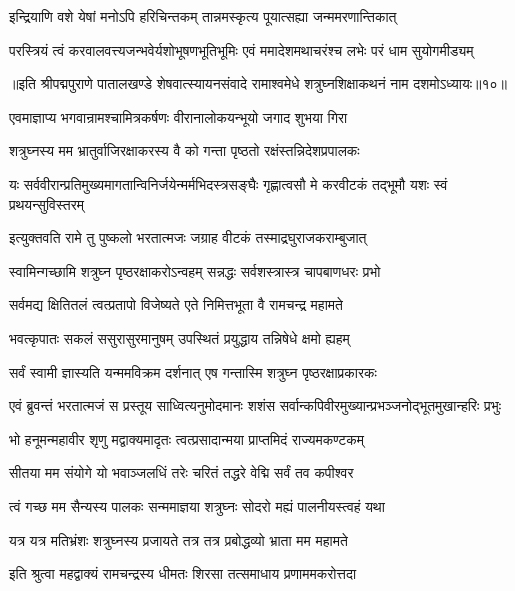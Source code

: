\twolineshloka
{इन्द्रियाणि वशे येषां मनोऽपि हरिचिन्तकम्}
{तान्नमस्कृत्य पूयात्सह्या जन्ममरणान्तिकात्}%

\twolineshloka
{परस्त्रियं त्वं करवालवत्त्यजन्भवेर्यशोभूषणभूतिभूमिः}
{एवं ममादेशमथाचरंश्च लभेः परं धाम सुयोगमीड्यम्}%

{॥इति श्रीपद्मपुराणे पातालखण्डे शेषवात्स्यायनसंवादे रामाश्वमेधे शत्रुघ्नशिक्षाकथनं नाम दशमोऽध्यायः॥१०॥}



\twolineshloka
{एवमाज्ञाप्य भगवान्रामश्चामित्रकर्षणः}
{वीरानालोकयन्भूयो जगाद शुभया गिरा}%

\twolineshloka
{शत्रुघ्नस्य मम भ्रातुर्वाजिरक्षाकरस्य वै}
{को गन्ता पृष्ठतो रक्षंस्तन्निदेशप्रपालकः}%

\twolineshloka
{यः सर्ववीरान्प्रतिमुख्यमागतान्विनिर्जयेन्मर्मभिदस्त्रसङ्घैः}
{गृह्णात्वसौ मे करवीटकं तद्भूमौ यशः स्वं प्रथयन्सुविस्तरम्}%

\twolineshloka
{इत्युक्तवति रामे तु पुष्कलो भरतात्मजः}
{जग्राह वीटकं तस्माद्रघुराजकराम्बुजात्}%

\twolineshloka
{स्वामिन्गच्छामि शत्रुघ्न पृष्ठरक्षाकरोऽन्वहम्}
{सन्नद्धः सर्वशस्त्रास्त्र चापबाणधरः प्रभो}%

\twolineshloka
{सर्वमद्य क्षितितलं त्वत्प्रतापो विजेष्यते}
{एते निमित्तभूता वै रामचन्द्र महामते}%

\twolineshloka
{भवत्कृपातः सकलं ससुरासुरमानुषम्}
{उपस्थितं प्रयुद्धाय तन्निषेधे क्षमो ह्यहम्}%

\twolineshloka
{सर्वं स्वामी ज्ञास्यति यन्ममविक्रम दर्शनात्}
{एष गन्तास्मि शत्रुघ्न पृष्ठरक्षाप्रकारकः}%

\twolineshloka
{एवं ब्रुवन्तं भरतात्मजं स प्रस्तूय साध्वित्यनुमोदमानः}
{शशंस सर्वान्कपिवीरमुख्यान्प्रभञ्जनोद्भूतमुखान्हरिः प्रभुः}%

\twolineshloka
{भो हनूमन्महावीर शृणु मद्वाक्यमादृतः}
{त्वत्प्रसादान्मया प्राप्तमिदं राज्यमकण्टकम्}%

\twolineshloka
{सीतया मम संयोगे यो भवाञ्जलधिं तरेः}
{चरितं तद्धरे वेद्मि सर्वं तव कपीश्वर}%

\twolineshloka
{त्वं गच्छ मम सैन्यस्य पालकः सन्ममाज्ञया}
{शत्रुघ्नः सोदरो मह्यं पालनीयस्त्वहं यथा}%

\twolineshloka
{यत्र यत्र मतिभ्रंशः शत्रुघ्नस्य प्रजायते}
{तत्र तत्र प्रबोद्धव्यो भ्राता मम महामते}%

\twolineshloka
{इति श्रुत्वा महद्वाक्यं रामचन्द्रस्य धीमतः}
{शिरसा तत्समाधाय प्रणाममकरोत्तदा}%

